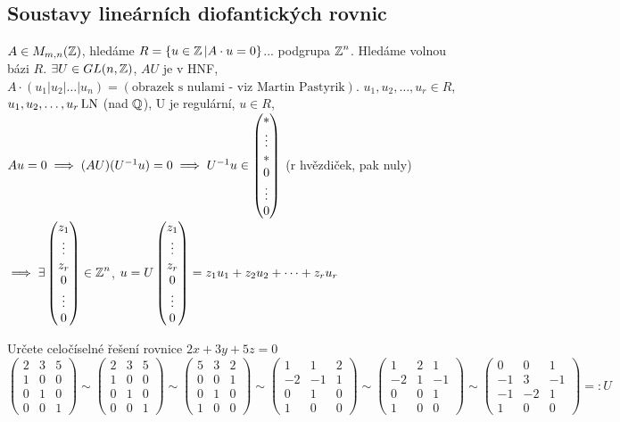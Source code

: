 \subsection{Soustavy lineárních diofantických rovnic}
$A\in M_{m,n}(\operatorname{\mathbb{Z}})$, hledáme $R=\{u\in \operatorname{\mathbb{Z}}|A\cdot u=0\}$... podgrupa $\operatorname{\mathbb{Z}}^n$. Hledáme volnou bázi $R$.
$\exists U\in GL(n,\operatorname{\mathbb{Z}})$, $AU$ je v HNF, 
$A\cdot(u_1|u_2|\ldots|u_n)=(\text{obrazek s nulami - viz Martin Pastyrik})$.
$u_1,u_2,\ldots,u_r\in R$, $u_1,u_2,\ldots,u_r \operatorname{LN}$ (nad $\operatorname{\mathbb{Q}}$), U je regulární, $u\in R$, $Au=0\implies (AU)(U^{-1}u)=0\implies U^{-1}u\in \begin{pmatrix} * \\ \vdots \\ * \\ 0 \\ \vdots \\ 0 \end{pmatrix}$ (r hvězdiček, pak nuly) $\implies \exists\begin{pmatrix} z_1 \\ \vdots \\ z_r \\ 0 \\ \vdots \\ 0 \end{pmatrix}\in\operatorname{\mathbb{Z}}^n$, $u=U\begin{pmatrix} z_1 \\ \vdots \\ z_r \\ 0 \\ \vdots \\ 0 \end{pmatrix}=z_1u_1+z_2u_2+\cdots +z_ru_r$

\begin{example}
Určete celočíselné řešení rovnice $2x+3y+5z=0$\\
$$\begin{pmatrix}
2 & 3 & 5\\
\hline 
1 & 0 & 0\\
0 & 1 & 0\\
0 & 0 & 1
\end{pmatrix}\sim
\begin{pmatrix}
2 & 3 & 5\\
\hline
1 & 0 & 0\\
0 & 1 & 0\\
0 & 0 & 1
\end{pmatrix}\sim
\begin{pmatrix}
5 & 3 & 2\\
\hline
0 & 0 & 1\\
0 & 1 & 0\\
1 & 0 & 0
\end{pmatrix}\sim
\begin{pmatrix}
1 & 1 & 2\\
\hline
-2 & -1 & 1\\
0 & 1 & 0\\
1 & 0 & 0
\end{pmatrix}\sim
\begin{pmatrix}
1 & 2 & 1\\
\hline
-2 & 1 & -1\\
0 & 0 & 1\\
1 & 0 & 0
\end{pmatrix}\sim
\begin{pmatrix}
0 & 0 & 1\\
\hline
-1 & 3 & -1\\
-1 & -2 & 1\\
1 & 0 & 0
\end{pmatrix}
=:U$$
\end{example}


